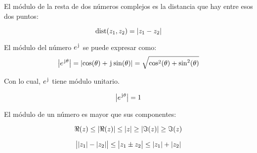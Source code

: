 El módulo de la resta de dos números complejos es la distancia que hay entre esos dos puntos:

\begin{mdframed}[style=PropertyFrame]
    \begin{prop}
        \label{prop:distance}
    \end{prop}
    \begin{equation*}
        \operatorname{dist}(z_1,z_2)={\left| {z_1-z_2} \right|}
    \end{equation*}
\end{mdframed}

El módulo del número $e^{\mkern2mu\mathrm{j}\mkern1mu}$ se puede expresar como:
\begin{equation*}
    {\left| {e^{\mkern2mu\mathrm{j}\mkern1mu\theta}} \right|} = {\left| {\cos(\theta) + \mkern2mu\mathrm{j}\mkern1mu \sin(\theta)} \right|} = \sqrt{\cos^2(\theta) + \sin^2(\theta)}
\end{equation*}

Con lo cual, $e^{\mkern2mu\mathrm{j}\mkern1mu}$ tiene módulo unitario.

\begin{mdframed}[style=PropertyFrame]
    \begin{prop}
        \label{prop:eAbsoluteValue}
    \end{prop}
    \begin{equation*}
        {\left| {e^{\mkern2mu\mathrm{j}\mkern1mu\theta}} \right|} = 1
    \end{equation*}
\end{mdframed}

El módulo de un número es mayor que sus componentes:

\begin{mdframed}[style=PropertyFrame]
    \begin{prop}
        \label{prop:zAbsoluteValue}
    \end{prop}
    \begin{equation*}
        \Re(z) \leq {\left| {\Re(z)} \right|} \leq {\left| {z} \right|} \geq {\left| {\Im(z)} \right|} \geq \Im(z)
    \end{equation*}
\end{mdframed}

\begin{mdframed}[style=PropertyFrame]
    \begin{prop}
        \label{prop:triangleInequality}
    \end{prop}
    \begin{equation*}
        \big| {\left| {z_1} \right|}-{\left| {z_2} \right|} \big| \leq \big| z_1 \pm z_2 \big|\leq {\left| {z_1} \right|} + {\left| {z_2} \right|}
    \end{equation*}
\end{mdframed}

